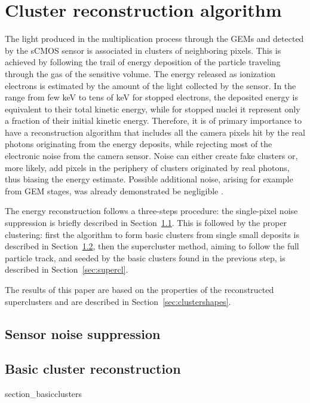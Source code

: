 \documentclass[12pt]{iopart}
\begin{document}
\clearpage
 
\section{Cluster reconstruction algorithm}
\label{sec:clustering}
The light produced in the multiplication process through the GEMs and
detected by the sCMOS sensor is associated in clusters of neighboring
pixels. This is achieved by following the trail of energy deposition
of the particle traveling through the gas of the sensitive volume. The
energy released as ionization electrons is estimated by the amount of
the light collected by the sensor.  In the range from few keV to tens
of keV for stopped electrons, the deposited energy is equivalent to
their total kinetic energy, while for stopped nuclei it represent only
a fraction of their initial kinetic energy.  Therefore, it is of
primary importance to have a reconstruction algorithm that includes
all the camera pixels hit by the real photons originating from the
energy deposits, while rejecting most of the electronic noise from the
camera sensor. Noise can either create fake clusters or, more likely,
add pixels in the periphery of clusters originated by real photons,
thus biasing the energy estimate.  Possible additional noise, arising
for example from GEM stages, was already demonstrated be negligible
\cite{bib:fe55}.

The energy reconstruction follows a three-steps procedure: the
single-pixel noise suppression is briefly described in
Section~\ref{sec:zerosuppression}. This is followed by the proper
clustering: first the algorithm to form basic clusters from single
small deposits is described in Section~\ref{sec:basiccl}, then the
supercluster method, aiming to follow the full particle track, and
seeded by the basic clusters found in the previous step, is described
in Section~\ref{sec:supercl}.

The results of this paper are based on the properties of the
reconstructed superclusters and are described in
Section~\ref{sec:clustershapes}.


\subsection{Sensor noise suppression}
\label{sec:zerosuppression}



\subsection{Basic cluster reconstruction}
\label{sec:basiccl}
 {section_basicclusters}
\end{document}
